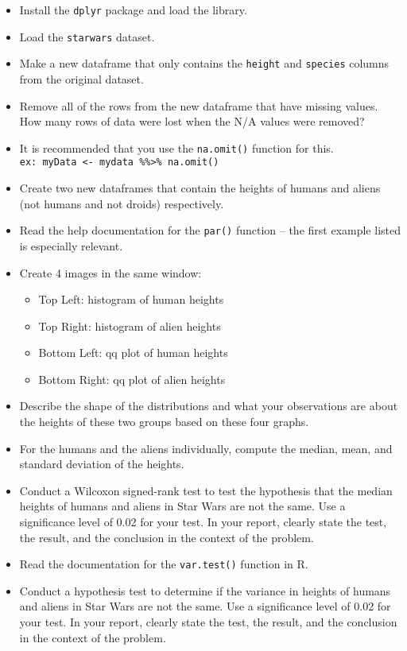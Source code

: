 \documentclass{article}
\begin{document}
\begin{itemize}
    \item Install the \texttt{dplyr} package and load the library.
    \item Load the \texttt{starwars} dataset.
    \item Make a new dataframe that only contains the \texttt{height} and \texttt{species} columns from the original dataset.
    \item Remove all of the rows from the new dataframe that have missing values. How many rows of data were lost when the N/A values were removed?
    \item It is recommended that you use the \texttt{na.omit()} function for this. \\
    \texttt{ex: myData <- mydata \%\%>\% na.omit()}
    \item Create two new dataframes that contain the heights of humans and aliens (not humans and not droids) respectively.
    \item Read the help documentation for the \texttt{par()} function -- the first example listed is especially relevant.
    \item Create 4 images in the same window:
    \begin{itemize}
        \item Top Left: histogram of human heights
        \item Top Right: histogram of alien heights
        \item Bottom Left: qq plot of human heights
        \item Bottom Right: qq plot of alien heights
    \end{itemize}
    \item Describe the shape of the distributions and what your observations are about the heights of these two groups based on these four graphs.
    \item For the humans and the aliens individually, compute the median, mean, and standard deviation of the heights.
    \item Conduct a Wilcoxon signed-rank test to test the hypothesis that the median heights of humans and aliens in Star Wars are not the same. Use a significance level of 0.02 for your test. In your report, clearly state the test, the result, and the conclusion in the context of the problem.
    \item Read the documentation for the \texttt{var.test()} function in R.
    \item Conduct a hypothesis test to determine if the variance in heights of humans and aliens in Star Wars are not the same. Use a significance level of 0.02 for your test. In your report, clearly state the test, the result, and the conclusion in the context of the problem.
\end{itemize}
\end{document}
